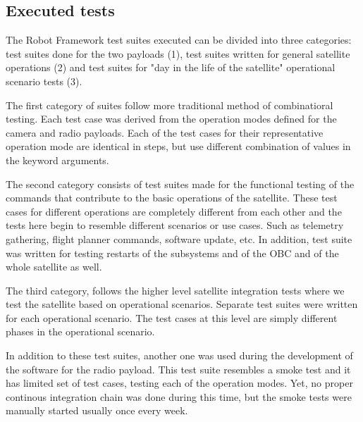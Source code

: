\documentclass[english,12pt,a4paper,pdftex,elec,utf8]{aaltothesis}
\begin{document}
\subsection{Executed tests}
The Robot Framework test suites executed can be divided into three categories: test suites done for the two payloads (1), test suites written for general satellite operations (2) and test suites for "day in the life of the satellite" operational scenario tests (3). \par 
The first category of suites follow more traditional method of combinatioral testing. Each test case was derived from the operation modes defined for the camera and radio payloads. Each of the test cases for their representative operation mode are identical in steps, but use different combination of values in the keyword arguments. \par
The second category consists of test suites made for the functional testing of the commands that contribute to the basic operations of the satellite. These test cases for different operations are completely different from each other and the tests here begin to resemble different scenarios or use cases. Such as telemetry gathering, flight planner commands, software update, etc. In addition, test suite was written for testing restarts of the subsystems and of the OBC and of the whole satellite as well.\par 
The third category, follows the higher level satellite integration tests where we test the satellite based on operational scenarios. Separate test suites were written for each operational scenario. The test cases at this level are simply different phases in the operational scenario.\par
In addition to these test suites, another one was used during the development of the software for the radio payload. This test suite resembles a smoke test and it has limited set of test cases, testing each of the operation modes. Yet, no proper continous integration chain was done during this time, but the smoke tests were manually started usually once every week.\par   
\end{document}
